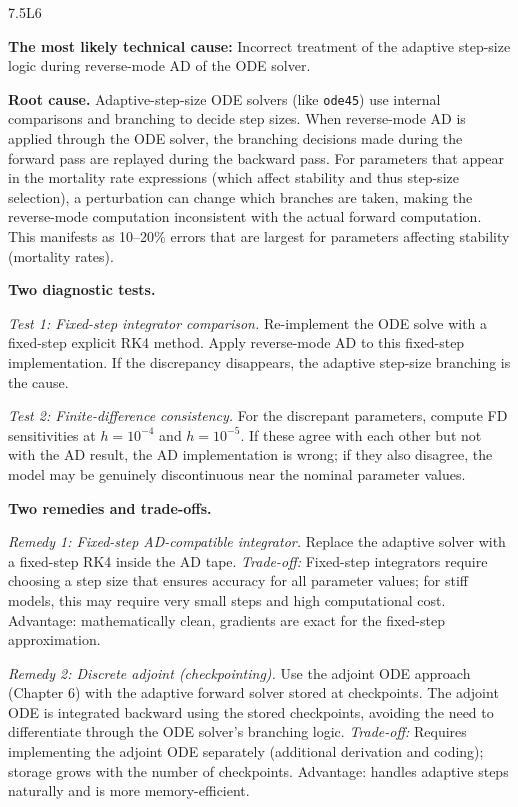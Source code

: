 \begin{solution}{7.5}{L6}

\solanswer

\textbf{The most likely technical cause:} Incorrect treatment of the
adaptive step-size logic during reverse-mode AD of the ODE solver.

 \textbf{Root cause.}
Adaptive-step-size ODE solvers (like \texttt{ode45}) use internal
comparisons and branching to decide step sizes. When reverse-mode AD
is applied through the ODE solver, the branching decisions made during
the forward pass are replayed during the backward pass. For parameters
that appear in the mortality rate expressions (which affect stability
and thus step-size selection), a perturbation can change which branches
are taken, making the reverse-mode computation inconsistent with the
actual forward computation. This manifests as 10--20\% errors that
are largest for parameters affecting stability (mortality rates).

 \textbf{Two diagnostic tests.}

\textit{Test 1: Fixed-step integrator comparison.}
Re-implement the ODE solve with a fixed-step explicit RK4 method.
Apply reverse-mode AD to this fixed-step implementation. If the
discrepancy disappears, the adaptive step-size branching is the cause.

\textit{Test 2: Finite-difference consistency.}
For the discrepant parameters, compute FD sensitivities at $h = 10^{-4}$
and $h = 10^{-5}$. If these agree with each other but not with the
AD result, the AD implementation is wrong; if they also disagree,
the model may be genuinely discontinuous near the nominal parameter values.

 \textbf{Two remedies and trade-offs.}

\textit{Remedy 1: Fixed-step AD-compatible integrator.}
Replace the adaptive solver with a fixed-step RK4 inside the AD tape.
\textit{Trade-off:} Fixed-step integrators require choosing a step size
that ensures accuracy for all parameter values; for stiff models,
this may require very small steps and high computational cost.
Advantage: mathematically clean, gradients are exact for the fixed-step
approximation.

\textit{Remedy 2: Discrete adjoint (checkpointing).}
Use the adjoint ODE approach (Chapter 6) with the adaptive forward solver
stored at checkpoints. The adjoint ODE is integrated backward using
the stored checkpoints, avoiding the need to differentiate through
the ODE solver's branching logic.
\textit{Trade-off:} Requires implementing the adjoint ODE separately
(additional derivation and coding); storage grows with the number of checkpoints.
Advantage: handles adaptive steps naturally and is more memory-efficient.


\end{solution}
